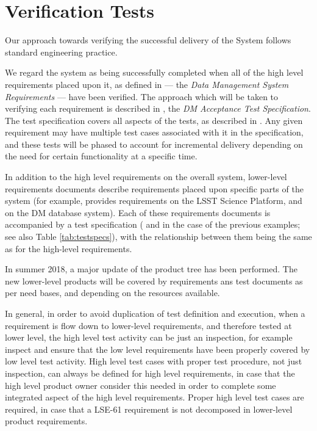 \section{Verification Tests \label{sect:approach}}

Our approach towards verifying the successful delivery of the \product{} System follows standard engineering practice.

We regard the system as being successfully completed when all of the high level requirements placed upon it, as defined in  --- the \emph{Data Management System Requirements} --- have been verified.
The approach which will be taken to verifying each requirement is described in , the \emph{DM Acceptance Test Specification}.
The test specification covers all aspects of the tests, as described in .
Any given requirement may have multiple test cases associated with it in the specification, and these tests will be phased to account for incremental delivery depending on the need for certain functionality at a specific time.

In addition to the high level requirements on the overall \product{} system, lower-level requirements documents describe requirements placed upon specific parts of the system (for example,  provides requirements on the LSST Science Platform, and  on the DM database system).
Each of these requirements documents is accompanied by a test specification ( and  in the case of the previous examples; see also Table \ref{tab:testspecs}), with the relationship between them being the same as for the high-level requirements.

In summer 2018, a major update of the \product{} product tree has been performed. The new lower-level products will be covered by requirements ans test documents as per need bases, and depending on the resources available.

In general, in order to avoid duplication of test definition and execution, when a requirement is flow down to lower-level requirements, and therefore tested at lower level, the high level test activity can be just an inspection, for example inspect and ensure that the low level requirements have been properly covered by low level test activity.
High level test cases with proper test procedure, not just inspection, can always be defined for high level requirements, in case that the high level product owner consider this needed in order to complete some integrated aspect of the high level requirements.
Proper high level test cases are required, in case that a LSE-61 requirement is not decomposed in lower-level product requirements.


